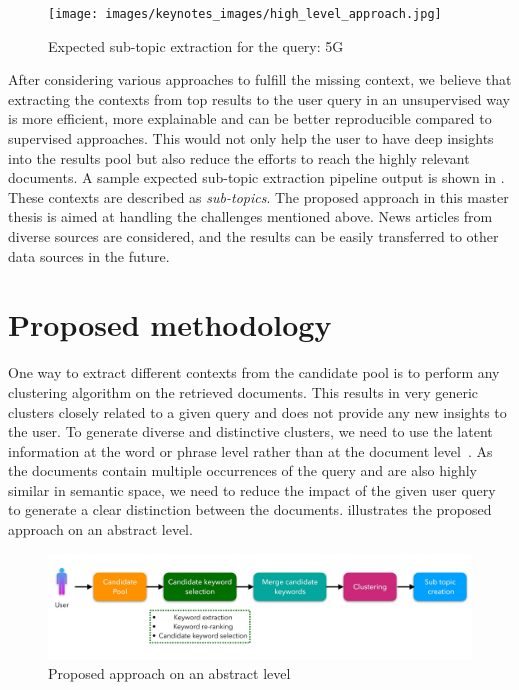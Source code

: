 \documentclass[master,proposal,extern,palatino]{rgseThesis}
\begin{document}
\begin{figure}[h]
	\centering
	\texttt{[image: images/keynotes\_images/high\_level\_approach.jpg]}
	\caption{Expected sub-topic extraction for the query: 5G \label{fig:proposal_idea}}
\end{figure}

After considering various approaches to fulfill the missing context, we believe that extracting the contexts
from top results to the user query in an unsupervised way is more efficient, more explainable and can be better reproducible compared to supervised approaches. This would not only help the user to have deep insights into the results pool but also reduce the efforts to reach the highly relevant documents. A sample expected sub-topic extraction pipeline output is shown in . These contexts are described as \textit{sub-topics}.  The proposed approach in this master thesis is aimed at handling the challenges mentioned above. News articles from diverse sources are considered, and the results can be easily transferred to other data sources in the future. 


	\section{Proposed methodology}

One way to extract different contexts from the candidate pool is to perform any clustering
algorithm on the retrieved documents. This results in very generic clusters closely related to a given query and does not provide any new insights to the user. To generate diverse and distinctive clusters, we need to use the latent information at the word or phrase level rather than at the document level~\cite{blei2003latent}. As the documents contain multiple occurrences of the query and are also highly similar in semantic space, we need to reduce the impact of the given user query to generate a clear distinction between the documents.  illustrates the proposed approach on an abstract level. 

\begin{figure}[h]
	\centering
	\includegraphics[width=.8\textwidth]{images/keynotes_images/methodology.jpg}
	\caption{Proposed approach on an abstract level \label{fig:methodology2}}
\end{figure}
\end{document}
